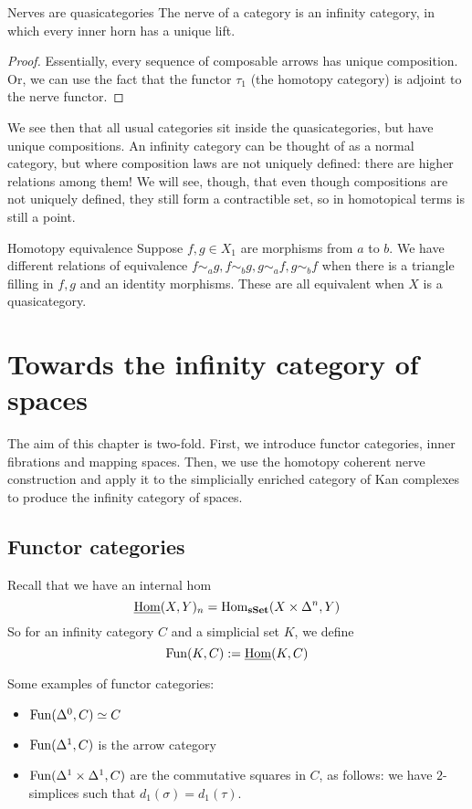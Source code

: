 \begin{proposition}{Nerves are quasicategories}{}
    The nerve of a category is an infinity category, in which every inner horn has a unique lift.
\end{proposition} 
\begin{proof}
    Essentially, every sequence of composable arrows has unique composition. Or, we can use the fact that the functor $\tau_1$ (the homotopy category) is adjoint to the nerve functor.
\end{proof}

We see then that all usual categories sit inside the quasicategories, but have unique compositions. An infinity category can be thought of as a normal category, but where composition laws are not uniquely defined: there are higher relations among them! We will see, though, that even though compositions are not uniquely defined, they still form a contractible set, so in homotopical terms is still a point.

\begin{definition}{Homotopy equivalence}{}
    Suppose $f,g\in X_1$ are morphisms from $a$ to $b$. We have different relations of equivalence $f\sim_a g, f\sim_b g, g\sim_a f, g\sim_b f$ when there is a triangle filling in $f,g$ and an identity morphisms. These are all equivalent when $X$ is a quasicategory.
\end{definition}

\newpage
\section{Towards the infinity category of spaces}

The aim of this chapter is two-fold. First, we introduce functor categories, inner fibrations and mapping spaces. Then, we use the homotopy coherent nerve construction and apply it to the simplicially enriched category of Kan complexes to produce the infinity category of spaces.

\subsection{Functor categories}

Recall that we have an internal hom $$\underline{\operatorname{Hom}}(X,Y)_n=\operatorname{Hom}_{\operatorname{\mathbf{sSet}}}(X\times \Delta^n,Y)$$So for an infinity category $C$ and a simplicial set $K$, we define $$\mathrm{Fun}(K,C):=\underline{\operatorname{Hom}}(K,C)$$

Some examples of functor categories: \begin{itemize}
    \item $\mathrm{Fun}(\Delta^0,C)\simeq C$
    \item $\mathrm{Fun}(\Delta^1,C)$ is the arrow category
    \item $\mathrm{Fun}(\Delta^1\times \Delta^1, C)$ are the commutative squares in $C$, as follows: we have $2$-simplices such that $d_1(\sigma)=d_1(\tau)$. 
\end{itemize} 

